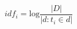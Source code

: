 \documentclass{article}
\begin{document}
    $$ idf_i = \mbox{log} \frac{|D|}{|{d : t_i \in d}|} $$
\end{document}
